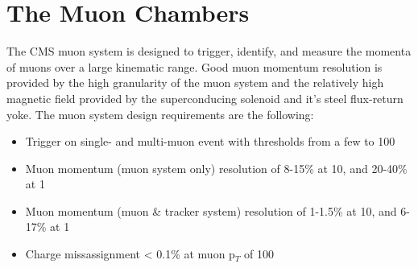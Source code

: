 \section{The Muon Chambers}
The CMS muon system is designed to trigger, identify, and measure the
momenta of muons over a large kinematic range. Good muon momentum
resolution is provided by the high granularity of the muon system and
the relatively high magnetic field provided by the superconducing
solenoid and it's steel flux-return yoke. The muon system design
requirements are the following:
\begin{itemize}
\item Trigger on single- and multi-muon event with thresholds from a
  few to 100\GeV
\item Muon momentum (muon system only) resolution of 8-15\% at 10\GeV,
  and 20-40\% at 1\TeV
\item Muon momentum (muon \& tracker system) resolution of 1-1.5\% at
  10\GeV, and 6-17\% at 1\TeV
\item Charge missassignment < 0.1\% at muon p$_{T}$ of 100\GeV
\end{itemize}

